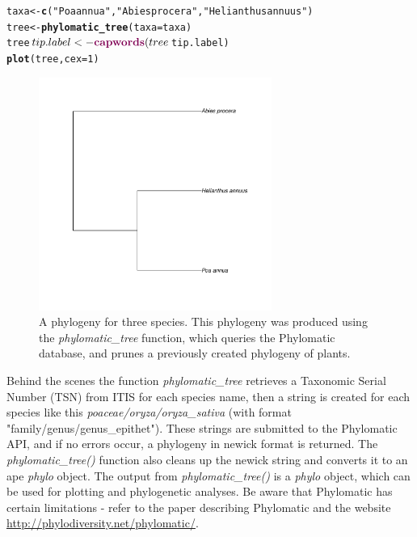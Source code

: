 \documentclass[10pt,a4paper,twocolumn]{article}
\makeatletter
\newcommand{\hlfunctioncall}[1]{\textcolor[rgb]{0.501960784313725,0,0.329411764705882}{\textbf{#1}}}%
\newcommand{\hlstring}[1]{\textcolor[rgb]{0.6,0.6,1}{#1}}%
\newenvironment{kframe}{%
 \def\at@end@of@kframe{}%
 \ifinner\ifhmode%
  \def\at@end@of@kframe{\end{minipage}}%
  \begin{minipage}{\columnwidth}%
 \fi\fi%
 \def\FrameCommand##1{\hskip\@totalleftmargin \hskip-\fboxsep
 \colorbox{shadecolor}{##1}\hskip-\fboxsep
     \hskip-\linewidth \hskip-\@totalleftmargin \hskip\columnwidth}%
 \MakeFramed {\advance\hsize-\width
   \@totalleftmargin\z@ \linewidth\hsize
   \@setminipage}}%
 {\par\unskip\endMakeFramed%
 \at@end@of@kframe}
\newenvironment{knitrout}{}{} %
\makeatother
\begin{document}
\begin{knitrout}
\begin{scriptsize}
\color{fgcolor}\begin{kframe}
\begin{alltt}
taxa <- \hlfunctioncall{c}(\hlstring{"Poa annua"}, \hlstring{"Abies procera"}, \hlstring{"Helianthus annuus"})
tree <- \hlfunctioncall{phylomatic_tree}(taxa = taxa)
tree$tip.label <- \hlfunctioncall{capwords}(tree$tip.label)
\hlfunctioncall{plot}(tree, cex = 1)
\end{alltt}
\end{kframe}
\end{scriptsize}
\end{knitrout}


\begin{figure}[!ht]
\begin{center}
\includegraphics[width=3in]{phylomaticphylogeny.pdf}
\end{center}
\caption{
{A phylogeny for three species. This phylogeny was produced using the \emph{phylomatic\_tree} function, which queries the Phylomatic database, and prunes a previously created phylogeny of plants.}
}
\label{fig:phylomatic}
\end{figure}


Behind the scenes the function \emph{phylomatic\_tree} retrieves a Taxonomic Serial Number (TSN) from ITIS for each species name, then a string is created for each species like this \emph{poaceae/oryza/oryza\_sativa} (with format "family/genus/genus\_epithet"). These strings are submitted to the Phylomatic API, and if no errors occur, a phylogeny in newick format is returned. The \emph{phylomatic\_tree()} function also cleans up the newick string and converts it to an ape \emph{phylo} object. The output from \emph{phylomatic\_tree()} is a \emph{phylo} object, which can be used for plotting and phylogenetic analyses. Be aware that Phylomatic has certain limitations - refer to the paper describing Phylomatic \cite{webb2005} and the website \url{http://phylodiversity.net/phylomatic/}.
\end{document}
